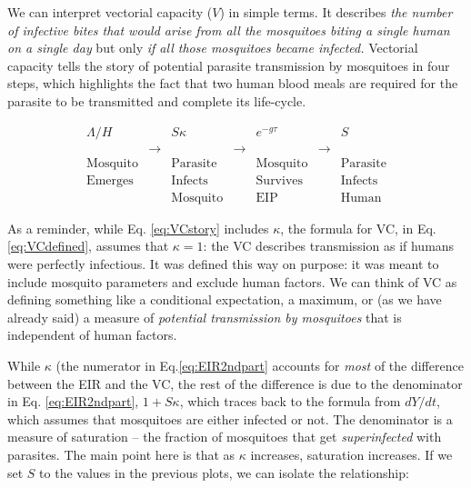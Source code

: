 \documentclass[
]{book}
\begin{document}
We can interpret vectorial capacity (\(V\)) in simple terms. It describes \emph{the number of infective bites that would arise from all the mosquitoes biting a single human on a single day} but only \emph{if all those mosquitoes became infected.} Vectorial capacity tells the story of potential parasite transmission by mosquitoes in four steps, which highlights the fact that two human blood meals are required for the parasite to be transmitted and complete its life-cycle.

\begin{equation}
\begin{array}{|c|c|c|c|c|c|c|}
\Lambda/H &  & S \kappa &  & e^{-g\tau} & & S \\
& \rightarrow &  & \rightarrow &  & \rightarrow &  \\
\mbox{Mosquito} & & \mbox{Parasite} & & \mbox{Mosquito} && \mbox{Parasite} \\
\mbox{Emerges} & & \mbox{Infects} & & \mbox{Survives} && \mbox{Infects} \\
 & & \mbox{Mosquito} & & \mbox{EIP} && \mbox{Human}
\end{array}
\label{eq:VCstory}
\end{equation}

As a reminder, while Eq. \eqref{eq:VCstory} includes \(\kappa\), the formula for VC, in Eq. \eqref{eq:VCdefined}, assumes that \(\kappa=1\): the VC describes transmission as if humans were perfectly infectious. It was defined this way on purpose: it was meant to include mosquito parameters and exclude human factors. We can think of VC as defining something like a conditional expectation, a maximum, or (as we have already said) a measure of \emph{potential transmission by mosquitoes} that is independent of human factors.

While \(\kappa\) (the numerator in Eq.\eqref{eq:EIR2ndpart} accounts for \emph{most} of the difference between the EIR and the VC, the rest of the difference is due to the denominator in Eq. \eqref{eq:EIR2ndpart}, \(1+S\kappa\), which traces back to the formula from \(dY/dt\), which assumes that mosquitoes are either infected or not. The denominator is a measure of saturation -- the fraction of mosquitoes that get \emph{superinfected} with parasites. The main point here is that as \(\kappa\) increases, saturation increases. If we set \(S\) to the values in the previous plots, we can isolate the relationship:
\end{document}
